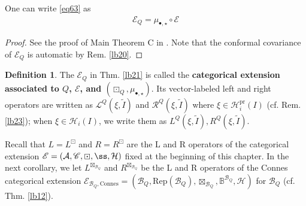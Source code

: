 \documentclass[11pt,b5paper,notitlepage]{article}
\theoremstyle{definition}
\newtheorem{df}{Definition}[section]
\theoremstyle{plain}
\newcommand{\mc}{\mathcal}
\newcommand{\wtd}{\widetilde}
\newcommand{\Rep}{\mathrm{Rep}}
\newcommand{\scr}{\mathscr}
\newcommand{\mbb}{\mathbb}
\newcommand{\blt}{\bullet}
\newcommand{\pr}{\mathrm {pr}}
\newcommand{\Connes}{\mathrm{Connes}}
\numberwithin{equation}{section}
\begin{document}
One can write \eqref{eq63} as
\begin{align}
\scr E_Q=\mu_{\blt,\star}\circ\scr E
\end{align}

\begin{proof}
See the proof of Main Theorem C in \cite[Sec. 5]{Gui21c}. Note that the conformal covariance of $\scr E_Q$ is automatic by Rem. \ref{lb20}.
\end{proof}









\begin{df}\label{lb69}
The $\scr E_Q$ in Thm. \ref{lb21} is called the \textbf{categorical extension associated to $Q$, $\scr E$, and $(\boxdot_Q,\mu_{\blt,\star})$}. Its vector-labeled left and right operators are written as $\scr L^Q(\xi,\wtd I)$ and $\scr R^Q(\xi,\wtd I)$ where $\xi\in\mc H_i^\pr(I)$ (cf. Rem. \ref{lb23}); when $\xi\in\mc H_i(I)$, we write them as $L^Q(\xi,\wtd I),R^Q(\xi,\wtd I)$.  
\end{df}





Recall that $L=L^\boxdot$ and $R=R^\boxdot$ are the L and R operators of the categorical extension $\scr E=(\mc A,\scr C,\boxdot,\ss,\mc H)$ fixed at the beginning of this chapter. In the next corollary, we let $L^{\boxtimes_{\mc B_Q}}$ and $R^{\boxtimes_{\mc B_Q}}$ be the L and R operators of the Connes categorical extension $\scr E_{\mc B_Q,\Connes}=(\mc B_Q,\Rep(\mc B_Q),\boxtimes_{\mc B_Q},\mbb B^{\mc B_Q},\mc H)$ for $\mc B_Q$ (cf. Thm. \ref{lb12}).
\end{document}
